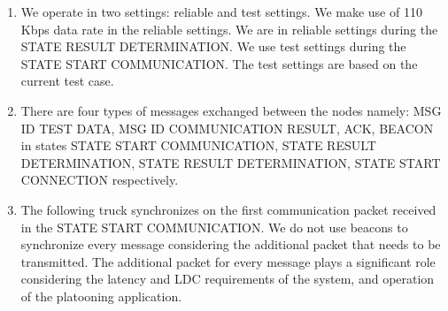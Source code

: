 \begin{enumerate}
    \item We operate in two settings: reliable and test settings. We make use of 110 Kbps data rate in the reliable settings. We are in reliable settings during the STATE RESULT DETERMINATION. We use test settings during the STATE START COMMUNICATION. The test settings are based on the current test case.
    \item There are four types of messages exchanged between the nodes namely: MSG ID TEST DATA, MSG ID COMMUNICATION RESULT, ACK, BEACON in states STATE START COMMUNICATION, STATE RESULT DETERMINATION, STATE RESULT DETERMINATION, STATE START CONNECTION respectively.
    \item The following truck synchronizes on the first communication packet received in the STATE START COMMUNICATION. We do not use beacons to synchronize every message considering the additional packet that needs to be transmitted. The additional packet for every message plays a significant role considering the latency and LDC requirements of the system, and operation of the platooning application.
    
\end{enumerate}

